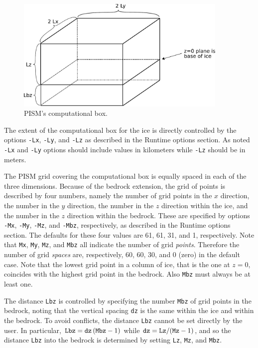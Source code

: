 \documentclass[11pt,final]{amsart}
\renewcommand{\t}[1]{\texttt{#1}}
\begin{document}
\begin{figure}[ht]
\includegraphics[width=4.0in,keepaspectratio=true]{figs/rectilinearbox}
\caption{PISM's computational box.}
\label{fig:rectilinearbox}
\end{figure}

The extent of the computational box for the ice is directly controlled by the options \t{-Lx}, \t{-Ly}, and \t{-Lz} as described in the Runtime options section.  As noted \t{-Lx} and \t{-Ly} options should include values in kilometers while \t{-Lz} should be in meters.

The PISM grid covering the computational box is equally spaced in each of the three dimensions.  Because of the bedrock extension, the grid of points is described by four numbers, namely the number of grid points in the $x$ direction, the number in the $y$ direction, the number in the $z$ direction within the ice, and the number in the $z$ direction within the bedrock.  These are specified by options \verb|-Mx|, \verb|-My|, \verb|-Mz|, and \verb|-Mbz|, respectively, as described in the Runtime options section.  The defaults for these four values are 61, 61, 31, and 1, respectively.  Note that \verb|Mx|, \verb|My|, \verb|Mz|, and \verb|Mbz| all indicate the number of grid \emph{points}.  Therefore the number of grid \emph{spaces} are, respectively, 60, 60, 30, and 0 (zero) in the default case.  Note that the lowest grid point in a column of ice, that is the one at $z=0$, coincides with the highest grid point in the bedrock.  Also \verb|Mbz| must always be at least one.

The distance \t{Lbz} is controlled by specifying the number \verb|Mbz| of grid points in the bedrock, noting that the vertical spacing \t{dz} is the same within the ice and within the bedrock.  To avoid conflicts, the distance \t{Lbz} cannot be set directly by the user.  In particular, $\text{\t{Lbz}}=\text{\t{dz}}\,(\text{\t{Mbz}}-1)$ while $\text{\t{dz}} = \text{\t{Lz}} / (\text{\t{Mz}}-1)$, and so the distance \t{Lbz} into the bedrock is determined by setting \t{Lz}, \t{Mz}, and \t{Mbz}.
\end{document}
